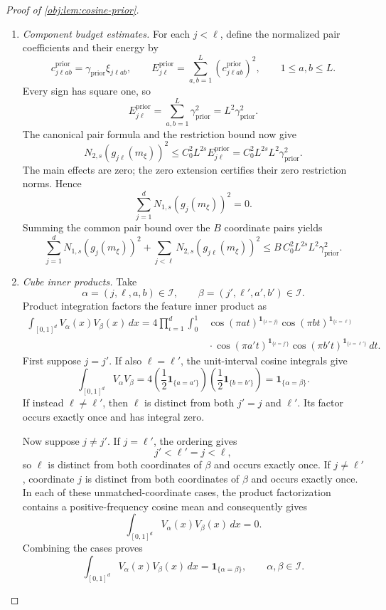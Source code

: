 \documentclass[11pt]{article}
\begin{document}
\begin{proof}[Proof of \cref{obj:lem:cosine-prior}]
\begin{enumerate}
\item \emph{Component budget estimates.}
For each \(j<\ell\), define the normalized pair coefficients and their
energy by
\[
c^{\mathrm{prior}}_{j\ell ab}
=\gamma_{\mathrm{prior}}\xi_{j\ell ab},
\qquad
E^{\mathrm{prior}}_{j\ell}
=\sum_{a,b=1}^L(c^{\mathrm{prior}}_{j\ell ab})^2,
\qquad 1\leq a,b\leq L.
\]
Every sign has square one, so
\[
E^{\mathrm{prior}}_{j\ell}
=\sum_{a,b=1}^L\gamma_{\mathrm{prior}}^2
=L^2\gamma_{\mathrm{prior}}^2.
\]
The canonical pair formula and the restriction bound now give
\[
N_{2,s}(g_{j\ell}(m_\xi))^2
\leq C_0^2L^{2s}E^{\mathrm{prior}}_{j\ell}
=C_0^2L^{2s}L^2\gamma_{\mathrm{prior}}^2.
\]
The main effects are zero; the zero extension certifies their zero
restriction norms. Hence
\[
\sum_{j=1}^dN_{1,s}(g_j(m_\xi))^2=0.
\]
Summing the common pair bound over the \(B\) coordinate pairs yields
\[
\sum_{j=1}^dN_{1,s}(g_j(m_\xi))^2
+\sum_{j<\ell}N_{2,s}(g_{j\ell}(m_\xi))^2
\leq B\,C_0^2L^{2s}L^2\gamma_{\mathrm{prior}}^2.
\]

\item \emph{Cube inner products.}
Take
\[
\alpha=(j,\ell,a,b)\in\mathcal I,
\qquad
\beta=(j',\ell',a',b')\in\mathcal I.
\]
Product integration factors the feature inner product as
\[
\begin{aligned}
\int_{[0,1]^d}V_\alpha(x)V_\beta(x)\,dx
=4\prod_{\iota=1}^d\int_0^1
&\cos(\pi a t)^{\mathbf1_{\{\iota=j\}}}
 \cos(\pi b t)^{\mathbf1_{\{\iota=\ell\}}}\\
&{}\cdot
 \cos(\pi a't)^{\mathbf1_{\{\iota=j'\}}}
 \cos(\pi b't)^{\mathbf1_{\{\iota=\ell'\}}}\,dt .
\end{aligned}
\]
First suppose \(j=j'\). If also \(\ell=\ell'\), the unit-interval cosine
integrals give
\[
\int_{[0,1]^d}V_\alpha V_\beta
=4\left(\frac12\mathbf1_{\{a=a'\}}\right)
  \left(\frac12\mathbf1_{\{b=b'\}}\right)
=\mathbf1_{\{\alpha=\beta\}}.
\]
If instead \(\ell\ne\ell'\), then \(\ell\) is distinct from both
\(j'=j\) and \(\ell'\). Its factor occurs exactly once and has integral
zero.

Now suppose \(j\ne j'\). If \(j=\ell'\), the ordering gives
\[
j'<\ell'=j<\ell,
\]
so \(\ell\) is distinct from both coordinates of \(\beta\) and occurs
exactly once. If \(j\ne\ell'\), coordinate \(j\) is distinct from both
coordinates of \(\beta\) and occurs exactly once. In each of these
unmatched-coordinate cases, the product factorization contains a
positive-frequency cosine mean and consequently gives
\[
\int_{[0,1]^d}V_\alpha(x)V_\beta(x)\,dx=0.
\]
Combining the cases proves
\[
\int_{[0,1]^d}V_\alpha(x)V_\beta(x)\,dx
=\mathbf1_{\{\alpha=\beta\}},
\qquad \alpha,\beta\in\mathcal I.
\]


\end{enumerate}
\end{proof}
\end{document}
